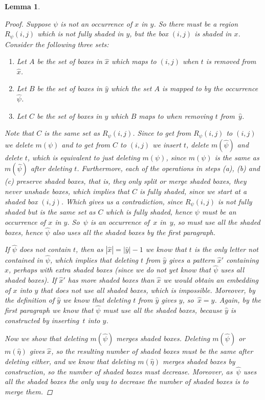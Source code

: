 \documentclass[preprint,11pt]{elsarticle}
\newtheorem{lem}[thm]{Lemma}\crefname{lem}{Lemma}{Lemmas}
\numberwithin{equation}{section}
\numberwithin{figure}{section}
\numberwithin{thm}{section}
\begin{document}
\begin{lem}
\begin{proof}
Suppose $\psi$ is not an occurrence of $x$ in $y$. So there must be a region $R_\psi(i,j)$ which is not fully shaded in $y$,
 but the box $(i,j)$ is shaded in $x$. Consider the following three sets:
 \begin{enumerate}
 \item[(a)] Let $A$ be the set of boxes in $\hat{x}$ which maps to $(i,j)$ when $t$ is removed from $\hat{x}$. 
 \item[(b)] Let $B$ be the set of boxes in $\hat{y}$ which the set $A$ is mapped to by the occurrence $\hat{\psi}$.
 \item[(c)] Let $C$ be the set of boxes in $y$ which $B$ maps to when removing $t$ from~$\hat{y}$.
 \end{enumerate}
 Note that $C$ is the same set as $R_\psi(i,j)$. Since to get from $R_\psi(i,j)$ to $(i,j)$ we delete $m(\psi)$
 and to get from $C$ to $(i,j)$ we insert $t$, delete $m(\hat{\psi})$ and delete $t$,
 which is equivalent to just deleting $m(\psi)$, since $m(\psi)$ is the same as $m(\hat{\psi})$ after deleting $t$.
 Furthermore, each of the operations in steps (a), (b) and (c) preserve shaded boxes, that is, they only split or merge shaded boxes, they never unshade
 boxes, which implies that $C$ is fully shaded, since we start at a shaded box $(i,j)$. Which gives us a contradiction, since $R_\psi(i,j)$ is not fully shaded
 but is the same set as $C$ which is fully shaded, hence $\psi$ must be an occurrence of $x$ in $y$.
 So~$\psi$ is an occurrence of~$x$ in~$y$, so must use all the shaded boxes, hence $\hat{\psi}$ also uses
 all the shaded boxes by the first paragraph.

If $\hat{\psi}$ does not contain $t$, then as $|\hat{x}|=|\hat{y}|-1$ we know that $t$ is the only letter not contained in $\hat{\psi}$,
 which implies that deleting $t$ from $\hat{y}$ gives a pattern $\hat{x}'$ containing $\hat{x}$, perhaps
 with extra shaded boxes (since we do not yet know that $\hat{\psi}$ uses all shaded boxes).
 If $\hat{x}'$ has more shaded boxes than $\hat{x}$ we would obtain an embedding of $x$ into
 $y$ that does not use all shaded boxes, which is impossible.
 Moreover, by the definition of $\hat{y}$ we know that deleting $t$ from $\hat{y}$ gives $y$, so~$\hat{x}=y$. Again, by the first paragraph
 we know that $\hat{\psi}$ must use all the shaded boxes, because $\hat{y}$ is constructed by inserting~$t$ into $y$.

Now we show that deleting $m(\hat{\psi})$ merges shaded boxes. Deleting $m(\hat{\psi})$ or $m(\hat{\eta})$ gives $\hat{x}$,
 so the resulting number of shaded boxes must be the same after deleting either, and we know that deleting $m(\hat{\eta})$
 merges shaded boxes by construction, so the number of shaded boxes must decrease.
 Moreover, as~$\hat{\psi}$ uses all the shaded boxes the only way to decrease the number of shaded boxes is to merge them. 
 

\end{proof}
\end{lem}
\end{document}
